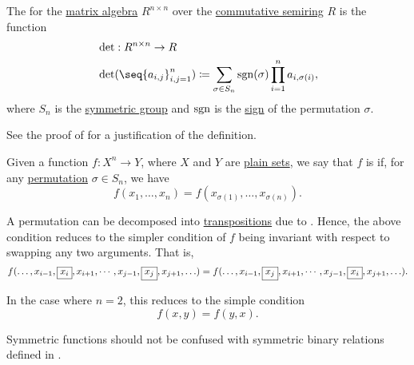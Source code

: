 \begin{definition}\label{def:matrix_determinant}
  The  for the \hyperref[thm:matrix_algebra]{matrix algebra} \( R^{n \times n} \) over the \hyperref[def:semiring/commutative]{commutative semiring} \( R \) is the function
  \begin{equation}\label{eq:def:matrix_determinant}
    \begin{aligned}
      &\det: R^{n \times n} \to R \\
      &\det(\seq{ a_{i,j} }_{i,j=1}^n) \coloneqq \sum_{\sigma \in S_n} \sgn(\sigma) \prod_{i=1}^n a_{i,\sigma(i)},
    \end{aligned}
  \end{equation}
  where \( S_n \) is the \hyperref[def:symmetric_group]{symmetric group} and \( \operatorname{sgn} \) is the \hyperref[def:permutation_parity]{sign} of the permutation \( \sigma \).

  See the proof of  for a justification of the definition.
\end{definition}

\begin{definition}\label{def:symmetric_function}\mimprovised
  Given a function \( f: X^n \to Y \), where \( X \) and \( Y \) are \hyperref[def:set]{plain sets}, we say that \( f \) is  if, for any \hyperref[def:symmetric_group/permutation]{permutation} \( \sigma \in S_n \), we have
  \begin{equation*}
    f(x_1, \ldots, x_n) = f(x_{\sigma(1)}, \ldots, x_{\sigma(n)}).
  \end{equation*}

  A permutation can be decomposed into \hyperref[def:symmetric_group/transposition]{transpositions} due to . Hence, the above condition reduces to the simpler condition of \( f \) being invariant with respect to swapping any two arguments. That is,
  \begin{equation*}
    f(\ldots, x_{i-1}, \fbox{\( x_i \)}, x_{i+1}, \cdots, x_{j-1}, \fbox{\( x_j \)}, x_{j+1}, \ldots)
    =
    f(\ldots, x_{i-1}, \fbox{\( x_j \)}, x_{i+1}, \cdots, x_{j-1}, \fbox{\( x_i \)}, x_{j+1}, \ldots).
  \end{equation*}

  In the case where \( n = 2 \), this reduces to the simple condition
  \begin{equation*}
    f(x, y) = f(y, x).
  \end{equation*}

  Symmetric functions should not be confused with symmetric binary relations defined in .
\end{definition}

